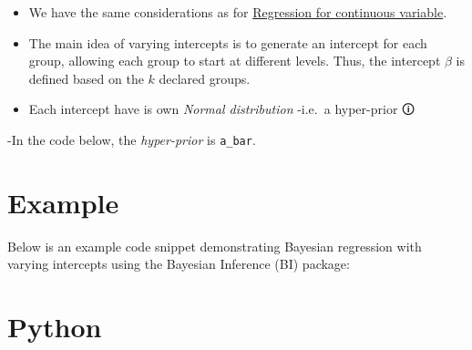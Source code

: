 \documentclass[
  letterpaper,
  DIV=11,
  numbers=noendperiod]{scrreprt}
\begin{document}
\begin{tcolorbox}[enhanced jigsaw, toptitle=1mm, opacityback=0, titlerule=0mm, breakable, bottomrule=.15mm, colframe=quarto-callout-caution-color-frame, arc=.35mm, coltitle=black, left=2mm, opacitybacktitle=0.6, leftrule=.75mm, toprule=.15mm, rightrule=.15mm, bottomtitle=1mm, colbacktitle=quarto-callout-caution-color!10!white, title=\textcolor{quarto-callout-caution-color}{\faFire}\hspace{0.5em}{Caution}, colback=white]

\begin{itemize}
\item
  We have the same considerations as for
  \href{1.\%20Linear\%20Regression\%20for\%20continuous\%20variable.qmd}{Regression
  for continuous variable}.
\item
  The main idea of varying intercepts is to generate an intercept for
  each group, allowing each group to start at different levels. Thus,
  the intercept \(\beta\) is defined based on the \(k\) declared groups.
\item
  Each intercept have is own \emph{Normal distribution} -i.e.~a
  \label{hyperP}{{hyper-prior 🛈}}
\end{itemize}

-In the code below, the \emph{hyper-prior} is \texttt{a\_bar}.

\end{tcolorbox}

\section{Example}\label{example-11}

Below is an example code snippet demonstrating Bayesian regression with
varying intercepts using the Bayesian Inference (BI) package:

\section{Python}
\end{document}
